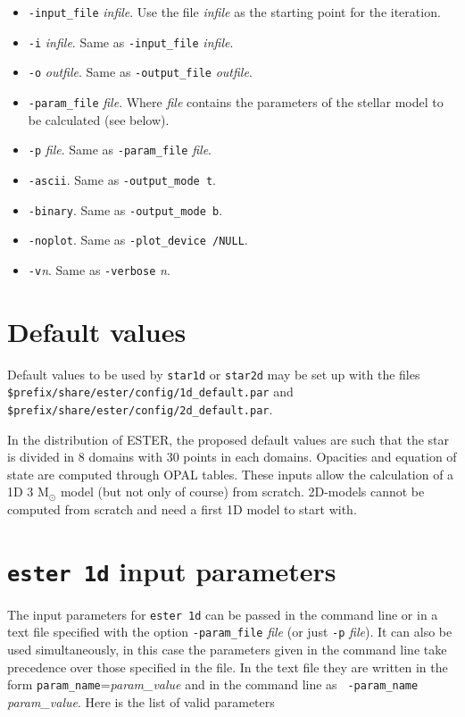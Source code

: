 \begin{itemize}
\item[] {\tt -input\_file} {\it infile}. Use the file {\it infile} as the starting point
for the iteration.
\item[] {\tt -i} {\it infile}. Same as {\tt -input\_file} {\it infile}.
\item[] {\tt -o} {\it outfile}. Same as {\tt -output\_file} {\it outfile}.
\item[] {\tt -param\_file} {\it file}. Where {\it file} contains the parameters of the 
stellar model to be calculated (see below).
\item[] {\tt -p} {\it file}. Same as {\tt -param\_file} {\it file}.
\item[] {\tt -ascii}. Same as {\tt -output\_mode t}.
\item[] {\tt -binary}. Same as {\tt -output\_mode b}.
\item[] {\tt -noplot}. Same as {\tt -plot\_device /NULL}.
\item[] {\tt -v}{\it n}. Same as {\tt -verbose} {\it n}.
\end{itemize}

\section{Default values}

Default values to be used by {\tt star1d} or {\tt star2d} may be set up
with the files {\tt \$prefix/share/ester/config/1d\_default.par} and {\tt
\$prefix/share/ester/config/2d\_default.par}.

In the distribution of ESTER, the proposed default values are such that
the star is divided in 8 domains with 30 points in each domains. Opacities
and equation of state are computed through OPAL tables. These inputs
allow the calculation of a 1D 3 M$_\odot$ model (but not only of course)
from scratch. 2D-models cannot be computed from scratch and need a first
1D model to start with.

\section{{\tt ester 1d} input parameters}

The input parameters for {\tt ester 1d} can be passed in the command line
or in a text file specified with the option {\tt -param\_file} {\it file}
(or just {\tt -p} {\it file}). It can also be used simultaneously, in
this case the parameters given in the command line take precedence over
those specified in the file. In the text file they are written in the
form {\tt param\_name}={\it param\_value} and in the command line as {\tt
-param\_name} {\it param\_value}.  Here is the list of valid parameters

